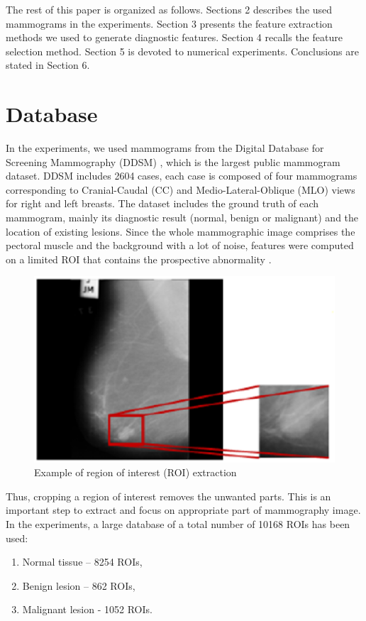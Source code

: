 \documentclass[review,12pt]{elsarticle}
\begin{document}
{The rest of this paper is organized as follows. Sections 2 describes the used mammograms in the experiments. Section 3 presents the feature extraction methods we used to generate diagnostic features. Section 4  recalls the feature selection method. Section 5 is devoted to numerical experiments. Conclusions are stated in Section 6.

\section{Database}
In the experiments, we used mammograms from the Digital Database for Screening Mammography (DDSM) \citep{Heath1998}, which is the largest public mammogram dataset. DDSM includes 2604 cases, each case is composed of four mammograms corresponding to Cranial-Caudal (CC) and Medio-Lateral-Oblique (MLO) views for right and left breasts. The dataset includes the ground truth of each mammogram, mainly its diagnostic result (normal, benign or malignant) and the location of existing lesions.  Since the whole mammographic image comprises the pectoral muscle and the background with a lot of noise, features were computed on a limited ROI that contains the prospective abnormality \citep{Dhahbi2015}.

\begin{figure}
\includegraphics[scale=0.7]{images/ROINEW.eps}
\caption{Example of region of interest (ROI) extraction}
\label{fig:ROI}
\end{figure}

Thus, cropping a region of interest removes the unwanted parts. This is an important step to extract and focus on appropriate part of mammography image.
In the experiments, a large database of a total number of 10168 ROIs has been used:
\begin{enumerate}
  \item Normal tissue – 8254 ROIs,
  \item Benign lesion – 862 ROIs,
  \item Malignant lesion - 1052 ROIs.
\end{enumerate}

}
\end{document}

